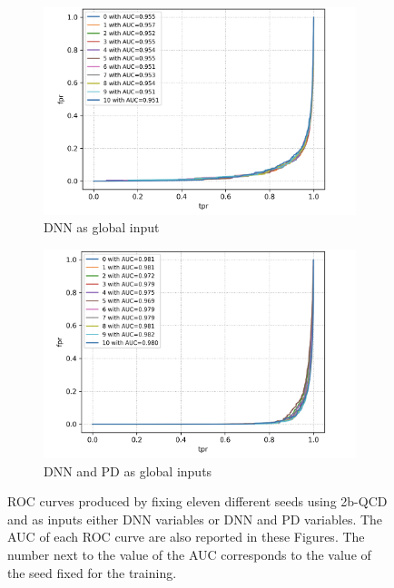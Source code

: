 \begin{figure}[hbt]
\centering
\begin{subfigure}{.5\textwidth}
  \centering
  \includegraphics[width=1.1\linewidth]{Images/7.S_B/Variability/2b QCD DNN.png}
  \caption{DNN as global input}
  \label{fig: 2b QCD DNN}
\end{subfigure}%
\begin{subfigure}{.5\textwidth}
  \centering
  \includegraphics[width=1.1\linewidth]{Images/7.S_B/Variability/2b QCD DNN and prob diff.png}
  \caption{DNN and PD as global inputs}
  \label{fig: 2b QCD DNN PD}
\end{subfigure}
\caption{ROC curves produced by fixing eleven different seeds using 2b-QCD and as inputs either DNN variables or DNN and PD variables. The AUC of each ROC curve are also reported in these Figures. The number next to the value of the AUC corresponds to the value of the seed fixed for the training.}
\label{fig: 2b QCD v ariability}
\end{figure}

